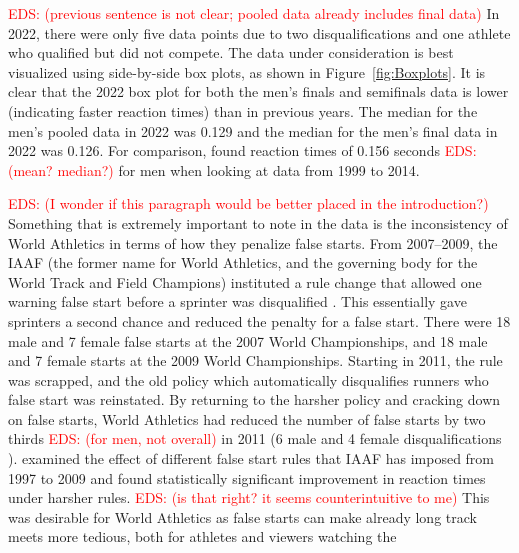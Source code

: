 \documentclass[12pt, letterpaper, titlepage]{article}
\newcommand{\eds}[1]{\textcolor{red}{EDS: (#1)}}
\begin{document}
\eds{previous sentence is not clear; pooled data already includes final data}
In 2022, there
were only five data points due to two disqualifications and one athlete who 
qualified but did not compete.
The data under consideration is best visualized using side-by-side box plots, as
shown in Figure~\ref{fig:Boxplots}.  It is clear that the 2022 box plot for both 
the men's finals and semifinals data is lower (indicating faster reaction times)
than in previous years.  The median for the men's pooled data in 2022 was 0.129
and the median for the men's final data in 2022 was 0.126.  For comparison,
\citet{brosnan2017effects} found reaction times of 0.156 seconds \eds{mean?  median?} for men when looking at data from 1999 to 2014.


\eds{I wonder if this paragraph would be better placed in the introduction?}
Something that is extremely important to note in the data is the inconsistency 
of World Athletics in terms of how they penalize false starts.  From 2007--2009,
the IAAF (the former name for World Athletics, and the governing body for the 
World Track and Field Champions) instituted a rule change that allowed one 
warning false start before a sprinter was disqualified 
\citep{iaaf2009falsestart}.  This 
essentially gave sprinters a second chance and reduced the penalty for a false 
start.  There were 18 male and 7 female false starts at the 2007 World 
Championships, and 18 male and 7 female starts at the 2009 World Championships. 
Starting in 2011, the rule was scrapped, and the old policy which automatically 
disqualifies runners who false start was reinstated. By returning to the harsher 
policy and cracking down on false starts, World Athletics had reduced the number 
of false starts by two thirds \eds{for men, not overall} in 2011 (6 male and 4 female disqualifications 
\citep{iaaf2009falsestart}).
\citet{haugen2013effect} examined the effect of different false start
rules that IAAF has imposed from 1997 to 2009 and found statistically 
significant improvement in reaction times under harsher rules.
\eds{is that right?  it seems counterintuitive to me}
This was desirable for World Athletics as false starts can make already long 
track meets more tedious, both for athletes and viewers watching the 
\end{document}
